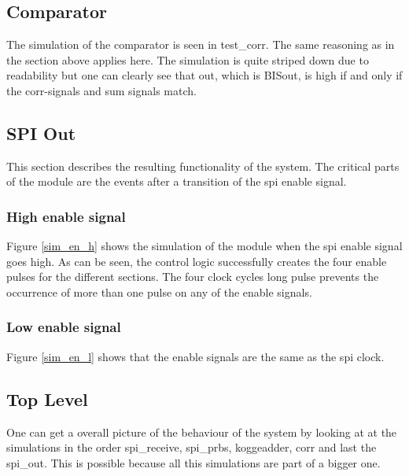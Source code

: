 \subsection{Comparator}
The simulation of the comparator is seen in test\_corr. The same reasoning as in the section above applies here. The simulation is quite striped down due to readability but one can clearly see that out, which is BISout, is high if and only if the corr-signals and sum signals match.

\subsection{SPI Out}
This section describes the resulting functionality of the system. The critical parts of the module are the events after a transition of the spi enable signal.
\subsubsection{High enable signal}
Figure \ref{sim_en_h} shows the simulation of the module when the spi enable signal goes high. As can be seen, the control logic successfully creates the four enable pulses for the different sections. The four clock cycles long pulse prevents the occurrence of more than one pulse on any of the enable signals. 




\subsubsection{Low enable signal}
Figure \ref{sim_en_l} shows that the enable signals are the same as the spi clock.


\subsection{Top Level}
One can get a overall picture of the behaviour of the system by looking at at the simulations in the order spi\_receive, spi\_prbs, koggeadder, corr and last the spi\_out. This is possible because all this simulations are part of a bigger one.
